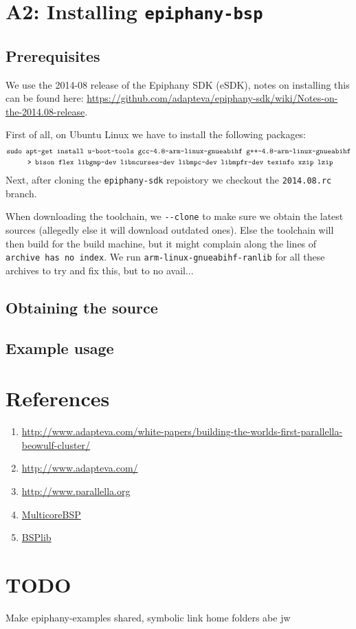 \documentclass{article}
\renewcommand{\(}{\left(}
\renewcommand{\)}{\right)}
\begin{document}
\section{A2: Installing \texttt{epiphany-bsp}}

\subsection{Prerequisites}

We use the 2014-08 release of the Epiphany SDK (eSDK), notes on installing this can be found here: \url{https://github.com/adapteva/epiphany-sdk/wiki/Notes-on-the-2014.08-release}.

First of all, on Ubuntu Linux we have to install the following packages:
\begin{align*} 
    &\texttt{sudo apt-get install u-boot-tools gcc-4.8-arm-linux-gnueabihf g++-4.8-arm-linux-gnueabihf} \\
    &\texttt{\hspace{1 cm}> bison flex libgmp-dev libncurses-dev libmpc-dev libmpfr-dev texinfo xzip lzip}
\end{align*}
Next, after cloning the \verb+epiphany-sdk+ repoistory we checkout the \texttt{2014.08.rc} branch.

When downloading the toolchain, we \verb+--clone+ to make sure we obtain the latest sources (allegedly else it will download outdated ones). Else the toolchain will then build for the build machine, but it might complain along the lines of \texttt{archive has no index}. We run \texttt{arm-linux-gnueabihf-ranlib} for all these archives to try and fix this, but to no avail...


\subsection{Obtaining the source}

\subsection{Example usage}

\section{References}

\begin{enumerate}
    \item \url{http://www.adapteva.com/white-papers/building-the-worlds-first-parallella-beowulf-cluster/}
    \item \url{http://www.adapteva.com/}
    \item \url{http://www.parallella.org}
    \item \url{MulticoreBSP}
    \item \url{BSPlib}
\end{enumerate}

\section{TODO}

Make epiphany-examples shared, symbolic link home folders abe jw
\end{document}
